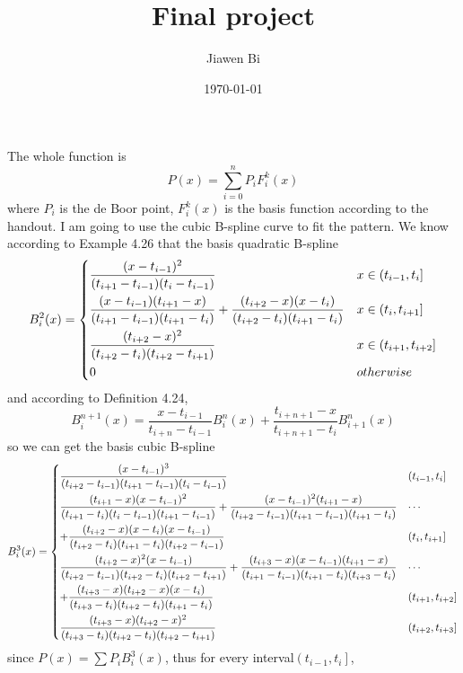 \documentclass[]{article}
\title{Final project}
\author{Jiawen Bi}
\date{\today}
\begin{document}
\maketitle
The whole function is $$
    P(x) = \sum_{i=0}^n P_i F_i^k(x)
   	$$
where $P_i$ is the de Boor point, $F_i^k(x)$ is the basis function according to the handout. 
I am going to use the cubic B-spline curve to fit the pattern.
We know according to Example 4.26 that the basis quadratic B-spline $$
	B_i^2(x) = \begin{dcases}
	\frac{(x-t_{i-1})^2}{(t_{i+1}-t_{i-1})(t_i - t_{i-1})} & x\in \left(t_{i-1},t_i\right] \\
	\frac{(x-t_{i-1})(t_{i+1}-x)}{(t_{i+1}-t_{i-1})(t_{i+1}-t_i)} + \frac{(t_{i+2}-x)(x-t_i)}{(t_{i+2}-t_i)(t_{i+1}-t_i)} & x\in \left(t_i,t_{i+1}\right] \\
	\frac{(t_{i+2}-x)^2}{(t_{i+2}-t_i)(t_{i+2}-t_{i+1})} & x\in \left(t_{i+1},t_{i+2} \right] \\
	0 & otherwise
	\end{dcases}
$$
and according to Definition 4.24, $$
	B_i^{n+1}(x) = \frac{x-t_{i-1}}{t_{i+n}-t_{i-1}}B_i^n(x) + \frac{t_{i+n+1} - x}{t_{i+n+1}-t_i} B_{i+1}^n(x)
$$
so we can get the basis cubic B-spline $$
	B_i^3(x) = \begin{dcases}
	\frac{(x-t_{i-1})^3}{(t_{i+2}-t_{i-1})(t_{i+1}-t_{i-1})(t_i-t_{i-1})} & \left(t_{i-1},t_i\right] \\
	\frac{(t_{i+1}-x)(x-t_{i-1})^2}{(t_{i+1}-t_i)(t_i-t_{i-1})(t_{i+1}-t_{i-1})} + \frac{(x-t_{i-1})^2(t_{i+1}-x)}{(t_{i+2}-t_{i-1})(t_{i+1}-t_{i-1})(t_{i+1}-t_i)} & \cdots \\ 
	 + \frac{(t_{i+2}-x)(x-t_i)(x-t_{i-1})}{(t_{i+2}-t_i)(t_{i+1}-t_i)(t_{i+2}-t_{i-1})} & \left(t_i,t_{i+1} \right] \\
	\frac{(t_{i+2}-x)^2(x-t_{i-1})}{(t_{i+2}-t_{i-1})(t_{i+2}-t_i)(t_{i+2}-t_{i+1})} + \frac{(t_{i+3}-x)(x-t_{i-1})(t_{i+1}-x)}{(t_{i+1}-t_{i-1})(t_{i+1}-t_i)(t_{i+3}-t_i)} & \cdots\\
	+\frac{(t_{i+3}-x)(t_{i+2}-x)(x-t_i)}{(t_{i+3}-t_i)(t_{i+2}-t_i)(t_{i+1}-t_i)} & \left(t_{i+1},t_{i+2} \right] \\
	\frac{(t_{i+3}-x)(t_{i+2}-x)^2}{(t_{i+3}-t_i)(t_{i+2}-t_i)(t_{i+2}-t_{i+1})} & \left(t_{i+2},t_{i+3} \right]
	\end{dcases}
$$
since $\displaystyle P(x) = \sum P_iB_i^3(x) $, thus for every interval$\displaystyle\left(t_{i-1},t_i\right]$,
\end{document}
